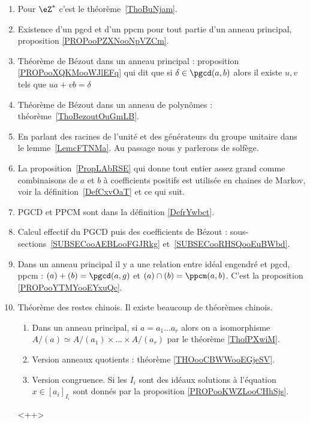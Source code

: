  \label{THEMEooNRZHooYuuHyt}
\begin{enumerate}
	\item
	      Pour \( \eZ^*\) c'est le théorème~\ref{ThoBuNjam}.
	\item
	      Existence d'un pgcd et d'un ppcm pour tout partie d'un anneau principal, proposition \ref{PROPooPZXNooNpVZCm}.
	\item
	      Théorème de Bézout dans un anneau principal : proposition \ref{PROPooXQKMooWJlEFq} qui dit que si \( \delta\in \pgcd(a,b) \) alors il existe \( u,v\) tels que \( ua+vb=\delta\)
	\item
	      Théorème de Bézout dans un anneau de polynômes : théorème~\ref{ThoBezoutOuGmLB}.
	\item
	      En parlant des racines de l'unité et des générateurs du groupe unitaire dans le lemme~\ref{LemcFTNMa}. Au passage nous y parlerons de solfège.
	\item
	      La proposition~\ref{PropLAbRSE} qui donne tout entier assez grand comme combinaisons de \( a \) et \( b\) à coefficients positifs est utilisée en chaines de Markov, voir la définition~\ref{DefCxvOaT} et ce qui suit.
	\item
	      PGCD et PPCM sont dans la définition \ref{DefrYwbct}.
	\item
	      Calcul effectif du PGCD puis des coefficients de Bézout : sous-sections~\ref{SUBSECooAEBLooFGJRkg} et~\ref{SUBSECooRHSQooEuBWbd}.
	\item
	      Dans un anneau principal il y a une relation entre idéal engendré et pgcd, ppcm : \( (a)+(b)=\pgcd(a,g)\) et \( (a)\cap(b)=\ppcm(a,b)\). C'est la proposition \ref{PROPooYTMYooEYxuQc}.
	\item
	      Théorème des restes chinois. Il existe beaucoup de théorèmes chinois.
	      \begin{enumerate}
		      \item
		            Dans un anneau principal, si \( a=a_1\ldots a_r\) alors on a isomorphisme \( A/(a)\simeq A/(a_1)\times \ldots\times A/(a_r)\) par le théorème \ref{ThofPXwiM}.
		      \item
		            Version anneaux quotients : théorème \ref{THOooCBWWooEGjeSV}.
		      \item
		            Version congruence. Si les \( I_i\) sont des idéaux  solutions à l'équation \( x\in[a_i]_{I_i}\) sont donnés par la proposition \ref{PROPooKWZLooCHhSjs}.
	      \end{enumerate}<++>
\end{enumerate}
